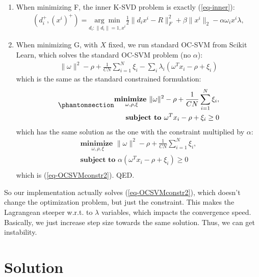 \documentclass[
  letterpaper,
  DIV=11,
  numbers=noendperiod]{scrartcl}
\begin{document}
\begin{enumerate}
\def\labelenumi{\arabic{enumi}.}
\item
  When minimizing F, the inner K-SVD problem is exactly
  (\ref{eq-inner}): \[
    \begin{align}
    (d^+_i,(x^i)^+) = \underset{d_i: \|d_i\|=1,x^i}{\arg\min} \frac12\|d_ix^i - R\|_F^2  + \beta\|x^i\|_2 - \alpha \omega_i x^i\lambda ,
    \end{align}
    \]
\item
  When minimizing G, with \(X\) fixed, we run standard OC-SVM from
  Scikit Learn, which solves the standard OC-SVM problem (no
  \(\alpha\)): \[
    \begin{align}
    \|\omega\|^2 - \rho + \frac{1}{CN} \sum_{i=1}^{N} \xi_i - \sum_i \lambda_i \left(\omega^T x_i - \rho + \xi_i \right)
    \end{align}
    \] which is the same as the standard constrained formulation:
  \begin{equation}\phantomsection\label{eq-OCSVMconstr-standard}{
    \begin{align}
    \underset{\omega, \rho, \xi}{\textbf{minimize  }} \|\omega\|^2 - \rho + \frac{1}{CN} \sum_{i=1}^{N} \xi_i, \\
    \textbf{subject to  } \omega^T x_i - \rho + \xi_i \geq 0\\
    \end{align}
    }\end{equation} which has the same solution as the one with the
  constraint multiplied by \(\alpha\): \[
    \begin{align}
    \underset{\omega, \rho, \xi}{\textbf{minimize  }} \|\omega\|^2 - \rho + \frac{1}{CN} \sum_{i=1}^{N} \xi_i, \\
    \textbf{subject to  } \alpha \left( \omega^T x_i - \rho + \xi_i \right) \geq 0\\
    \end{align}
    \] which is (\ref{eq-OCSVMconstr2}). QED.
\end{enumerate}

So our implementation actually solves (\ref{eq-OCSVMconstr2}), which
doesn't change the optimization problem, but just the constraint. This
makes the Lagrangean steeper w.r.t. to \(\lambda\) variables, which
impacts the convergence speed. Basically, we just increase step size
towards the same solution. Thus, we can get instability.

\section{Solution}\label{solution}
\end{document}

